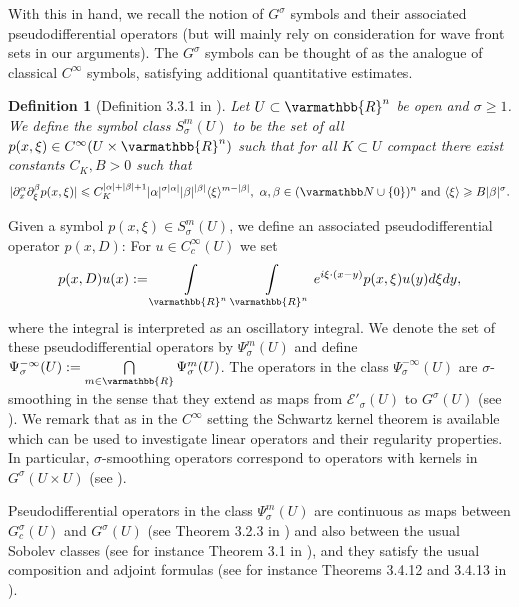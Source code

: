 \documentclass[12pt,twoside]{amsart}
\numberwithin{equation}{section}
\renewcommand{\leq}{\leqslant}
\renewcommand{\geq}{\geqslant}
\renewcommand{\mathbb}{\varmathbb}
\newtheorem{definition}[theorem]{Definition}
\newcommand {\R} {\mathbb{R}} \newcommand {\Z} {\mathbb{Z}}
\newcommand{\mR}{\mathbb{R}}                    %
\begin{document}
\begin{appendix}
With this in hand, we recall the notion of $G^{\sigma}$ symbols and their associated pseudodifferential operators (but will mainly rely on consideration for wave front sets in our arguments). The $G^{\sigma}$ symbols can be thought of as the analogue of classical $C^{\infty}$ symbols, satisfying additional quantitative estimates.


\begin{definition}[Definition 3.3.1 in \cite{Rodino_book}]
Let $U \subset \R^n$ be open and $\sigma \geq 1$. We define the symbol class $S^{m}_{\sigma}(U)$ to be the set of all $p(x,\xi)\in C^{\infty}(U \times \mR^n)$ such that for all $K \subset U$ compact there exist constants $C_K,B>0$ such that
\begin{align*}
|\partial^{\alpha}_x \partial^{\beta}_{\xi} p(x,\xi)| \leq C_K^{|\alpha|+|\beta|+1} |\alpha|^{\sigma |\alpha|} |\beta|^{ |\beta|} \langle \xi \rangle^{m-|\beta|}, \ \alpha, \beta \in (\N\cup \{0\})^n \mbox{ and } \langle \xi \rangle \geq B|\beta|^{\sigma}.
\end{align*}
\end{definition}


Given a symbol $p(x,\xi)\in S^m_{\sigma}(U)$, we define an associated pseudodifferential operator $p(x,D)$: For $u\in C_c^{\infty}(U)$ we set
\begin{align*}
p(x,D) u(x):= \int\limits_{\R^n} \int\limits_{\R^n} e^{i \xi \cdot (x-y)} p(x,\xi )u(y) d \xi  dy,
\end{align*}
where the integral is interpreted as an oscillatory integral.
We denote the set of these pseudodifferential operators by $\Psi^m_{\sigma}(U)$ and define $\Psi^{-\infty}_{\sigma}(U):= \bigcap\limits_{m \in \R } \Psi^{m}_{\sigma}(U)$. The operators in the class $\Psi^{-\infty}_{\sigma}(U)$ are $\sigma$-smoothing in the sense that they extend as maps from $\mathcal{E}'_{\sigma}(U)$ to $G^{\sigma}(U)$ (see \cite[Proposition 3.2.11]{Rodino_book}).
We remark that as in the $C^{\infty}$ setting the Schwartz kernel theorem is available which can be used to investigate linear operators and their regularity properties. In particular, $\sigma$-smoothing operators correspond to operators with kernels in $G^{\sigma}(U \times U)$ (see \cite[Chapter 1.5]{Rodino_book}).

Pseudodifferential operators in the class $\Psi^m_{\sigma}(U)$ are continuous as maps between $G_c^{\sigma}(U)$ and $G^{\sigma}(U)$ (see Theorem 3.2.3 in \cite{Rodino_book}) and also between the usual Sobolev classes (see for instance Theorem 3.1 in \cite{HuaRodino}), and they satisfy the usual composition and adjoint formulas (see for instance Theorems 3.4.12 and 3.4.13 in \cite{Rodino_book}).




\end{appendix}
\end{document}
